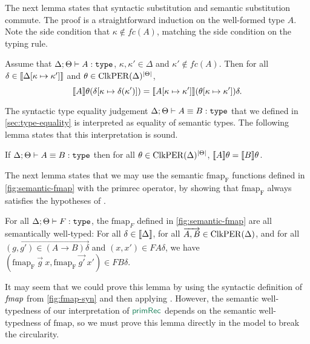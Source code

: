The next lemma states that syntactic substitution and semantic
substitution commute. The proof is a straightforward induction on the
well-formed type $A$. Note the side condition that $\kappa \not\in
\mathit{fc}(A)$, matching the side condition on the
 typing rule.

\begin{lemma}\label{lem:substitution-lemma}
  Assume that $\Delta; \Theta \vdash A : \texttt{\textup{type}}$, $\kappa, \kappa'
  \in \Delta$ and $\kappa' \not\in \mathit{fc}(A)$. Then for all
  $\delta \in \llbracket \Delta[\kappa\mapsto\kappa'] \rrbracket$ and $\theta \in
  \mathrm{ClkPER}(\Delta)^{|\Theta|}$,
  \begin{displaymath}
    \llbracket A \rrbracket\theta (\delta[\kappa \mapsto \delta(\kappa')]) = \llbracket A[\kappa\mapsto\kappa'] \rrbracket(\theta[\kappa\mapsto\kappa'])\delta.
  \end{displaymath}
\end{lemma}

The syntactic type equality judgement $\Delta; \Theta \vdash A \equiv
B : \texttt{\textup{type}}$ that we defined in \autoref{sec:type-equality} is
interpreted as equality of semantic types. The following lemma states
that this interpretation is sound.

\begin{lemma}\label{lem:type-equality}
  If $\Delta; \Theta \vdash A \equiv B : \texttt{\textup{type}}$ then for all
  $\theta \in \mathrm{ClkPER}(\Delta)^{|\Theta|}$, $\llbracket A \rrbracket\theta =
  \llbracket B \rrbracket\theta$.
\end{lemma}

The next lemma states that we may use the semantic $\mathrm{fmap_F}$
functions defined in \autoref{fig:semantic-fmap} with the
$\mathrm{primrec}$ operator, by showing that $\mathrm{fmap_F}$ always
satisfies the hypotheses of .

\begin{lemma}\label{lem:sem-fmap-well-typed}
  For all $\Delta; \Theta \vdash F : \texttt{\textup{type}}$, the $\mathrm{fmap}_F$
  defined in \autoref{fig:semantic-fmap} are all semantically
  well-typed: For all $\delta \in \llbracket \Delta \rrbracket$, for all $\overrightarrow{A,B}
  \in \mathrm{ClkPER}(\Delta)$, and for all $\overrightarrow{(g,g') \in (A \to B)\delta}$
  and $(x,x') \in FA\delta$, we have $(\mathrm{fmap_F}\ \overrightarrow{g}\ x,
  \mathrm{fmap_F}\ \overrightarrow{g'}\ x') \in FB\delta$.
\end{lemma}

It may seem that we could prove this lemma by using the syntactic
definition of $\textit{fmap}$ from \autoref{fig:fmap-syn} and then
applying . However, the semantic
well-typedness of our interpretation of $\elim{primRec}$ depends on
the semantic well-typedness of $\mathrm{fmap}$, so we must prove this
lemma directly in the model to break the circularity.


